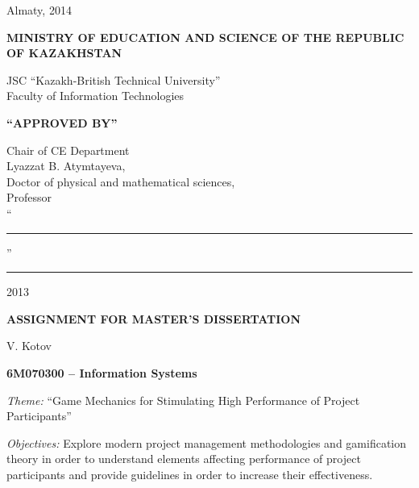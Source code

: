 \begin{titlepage}
\begin{center}
    \end{center}


    \begin{center}
        \vfill
        Almaty, 2014
    \end{center}

    \pagebreak


    \begin{center}
    {\bf{\MakeUppercase{Ministry of education and science of the republic of Kazakhstan}}

        \vspace{14pt}

        JSC ``Kazakh-British Technical University''\\
        Faculty of Information Technologies}

        \vspace{14pt}
        
        \begin{flushright}
            {\bf \MakeUppercase{``Approved by''}}

            Chair of CE Department\\
            Lyazzat B. Atymtayeva,\\
            Doctor of physical and mathematical sciences,\\
            Professor\\

            \vspace{0.5\baselineskip}
            ``\rule{2em}{0.4pt}'' \rule{8em}{0.4pt} 2013\\
            \end{flushright}
        
        {\bf
        \MakeUppercase{Assignment for master's dissertation}}

    \end{center}

    \setlength{\parindent}{0pt}
    \setlength{\parskip}{1ex plus 0.5ex minus 0.2ex}

    V. Kotov

    {\bf 6M070300 -- Information Systems}

    \emph{Theme:} ``Game Mechanics for Stimulating High Performance of Project Participants''
    
   \emph{Objectives:}
    Explore modern project management methodologies and gamification theory in order to understand elements affecting performance of project participants and provide guidelines in order to increase their effectiveness.
    

\end{titlepage}
